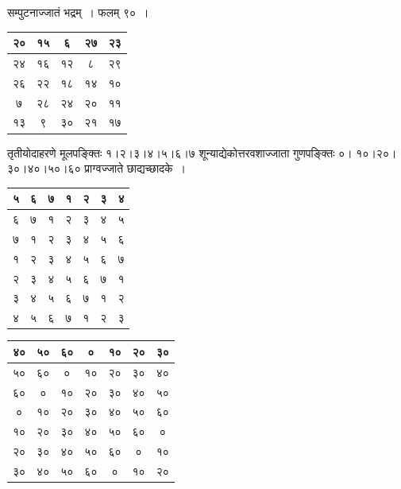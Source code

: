 \documentclass[11pt, openany]{book}
\begin{document}
\newpage

\begin{center}
सम्पुटनाज्जातं भद्रम्~। फलम् ९०~।
\end{center}
\vspace{-0.4cm}

\begin{table}[h]
\centering
\begin{tabular}{|c|c|c|c|c|}
	\hline
२० & १५ & ६ & २७ & २३ \\
\hline
२४ & १६ & १२ & ८ & २९\\
\hline
२६ & २२ & १८ & १४ & १० \\
\hline 
 ७ & २८ & २४ & २० & ११ \\
 \hline
  १३ & ९ & ३० & २१ & १७\\
  \hline
\end{tabular}
\end{table}

तृतीयोदाहरणे मूलपङ्क्तिः १।२।३।४।५।६।७ शून्याद्येकोत्तरवशाज्जाता गुणपङ्क्तिः ०। १०।२०।३०।४०।५०।६० प्राग्वज्जाते छाद्यच्छादके~।

\begin{table}[h]
	\centering
	\begin{tabular}{|c|c|c|c|c|c|c|}
		\hline
		५ & ६ & ७ & १ & २ & ३ & ४ \\
		\hline
		६ & ७ & १ & २ & ३ & ४ & ५ \\
		\hline
		७  & १ & २ & ३ & ४& ५ & ६  \\
		\hline 
		१ & २ & ३ & ४ & ५ & ६ & ७   \\
		\hline
		२ & ३ & ४ & ५ & ६ & ७ & १ \\
		\hline
		३ & ४ & ५ & ६ & ७ & १ & २\\
		\hline
		४ & ५ & ६ & ७ & १ & २ & ३ \\
		\hline
	\end{tabular}
\hspace{2mm}
\begin{tabular}{|c|c|c|c|c|c|c|}
	\hline
	४० & ५० & ६०  & ० & १० & २० & ३० \\
	\hline
	५० & ६० & ० & १० & २० & ३० & ४० \\
	\hline
	६०  & ० & १० & २० & ३० & ४० & ५०  \\
	\hline 
	० & १० & २० & ३० & ४० & ५० & ६०   \\
	\hline
	१० & २० & ३० & ४० & ५० & ६० & ० \\
	\hline
	२० & ३० & ४० & ५० & ६० & ० & १०\\
	\hline
	३० & ४० & ५० & ६० & ० & १० & २० \\
	\hline
\end{tabular}
\end{table}
\vspace{-3mm}
\end{document}

